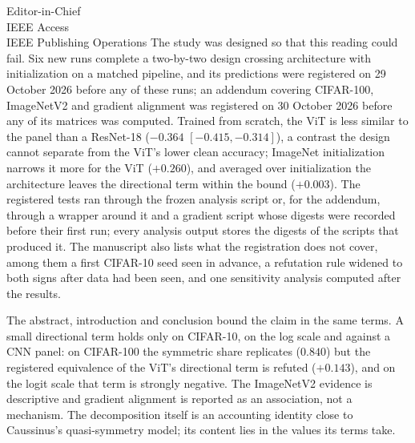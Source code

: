\documentclass[11pt]{letter}
\begin{document}
\begin{letter}{
Editor-in-Chief\\
IEEE Access\\
IEEE Publishing Operations
}
The study was designed so that this reading could fail. Six new runs complete a two-by-two design crossing architecture with initialization on a matched pipeline, and its predictions were registered on 29 October 2026 before any of these runs; an addendum covering CIFAR-100, ImageNetV2 and gradient alignment was registered on 30 October 2026 before any of its matrices was computed. Trained from scratch, the ViT is less similar to the panel than a ResNet-18 ($-0.364$ $[-0.415, -0.314]$), a contrast the design cannot separate from the ViT's lower clean accuracy; ImageNet initialization narrows it more for the ViT ($+0.260$), and averaged over initialization the architecture leaves the directional term within the bound ($+0.003$). The registered tests ran through the frozen analysis script or, for the addendum, through a wrapper around it and a gradient script whose digests were recorded before their first run; every analysis output stores the digests of the scripts that produced it. The manuscript also lists what the registration does not cover, among them a first CIFAR-10 seed seen in advance, a refutation rule widened to both signs after data had been seen, and one sensitivity analysis computed after the results.

The abstract, introduction and conclusion bound the claim in the same terms. A small directional term holds only on CIFAR-10, on the log scale and against a CNN panel: on CIFAR-100 the symmetric share replicates ($0.840$) but the registered equivalence of the ViT's directional term is refuted ($+0.143$), and on the logit scale that term is strongly negative. The ImageNetV2 evidence is descriptive and gradient alignment is reported as an association, not a mechanism. The decomposition itself is an accounting identity close to Caussinus's quasi-symmetry model; its content lies in the values its terms take.


\end{letter}
\end{document}
